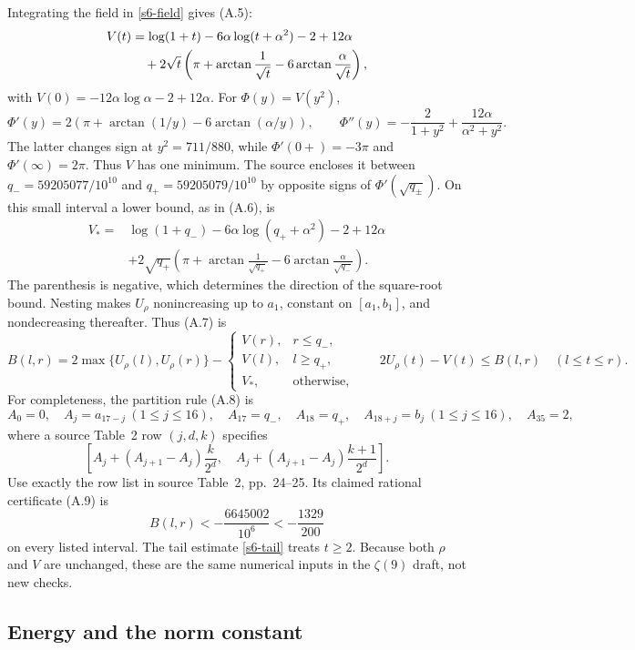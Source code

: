 Integrating the field in \eqref{s6-field} gives (A.5):
\begin{align}
 V(t)&=\log(1+t)-6\alpha\log(t+\alpha^2)-2+12\alpha\notag\\
 &\quad+2\sqrt t\left(\pi+\arctan\frac1{\sqrt t}
                                -6\arctan\frac\alpha{\sqrt t}\right),
 \label{appa-field-explicit}
\end{align}
with $V(0)=-12\alpha\log\alpha-2+12\alpha$.
For $\Phi(y)=V(y^2)$,
\[
 \Phi'(y)=2\left(\pi+\arctan(1/y)-6\arctan(\alpha/y)\right),
 \qquad \Phi''(y)=-\frac2{1+y^2}+\frac{12\alpha}{\alpha^2+y^2}.
\]
The latter changes sign at $y^2=711/880$, while
$\Phi'(0+)=-3\pi$ and $\Phi'(\infty)=2\pi$.  Thus $V$ has one minimum.
The source encloses it between
$q_-=59205077/10^{10}$ and $q_+=59205079/10^{10}$ by opposite
signs of $\Phi'(\sqrt{q_\pm})$.
On this small interval a lower bound, as in (A.6), is
\begin{align*}
 V_*={}&\log(1+q_-)-6\alpha\log(q_++\alpha^2)-2+12\alpha\\
 &+2\sqrt{q_+}\left(\pi+\arctan\frac1{\sqrt{q_+}}
                              -6\arctan\frac\alpha{\sqrt{q_-}}\right).
\end{align*}
The parenthesis is negative, which determines the direction of the
square-root bound.  Nesting makes $U_\rho$ nonincreasing up to $a_1$,
constant on $[a_1,b_1]$, and nondecreasing thereafter.  Thus (A.7) is
\[
 B(l,r)=2\max\{U_\rho(l),U_\rho(r)\}
 -\begin{cases}V(r),&r\le q_-,\\V(l),&l\ge q_+,\\V_*,&\text{otherwise},\end{cases}
 \qquad 2U_\rho(t)-V(t)\le B(l,r)\quad(l\le t\le r).
\]
For completeness, the partition rule (A.8) is
\[
 A_0=0,\quad A_j=a_{17-j}\ (1\le j\le16),\quad
 A_{17}=q_-,\quad A_{18}=q_+,\quad
 A_{18+j}=b_j\ (1\le j\le16),\quad A_{35}=2,
\]
where a source Table~2 row $(j,d,k)$ specifies
\[
 \left[A_j+(A_{j+1}-A_j)\frac{k}{2^d},\quad
       A_j+(A_{j+1}-A_j)\frac{k+1}{2^d}\right].
\]
Use exactly the row list in source Table~2, pp.~24--25.  Its claimed
rational certificate (A.9) is
\[
 B(l,r)<-\frac{6645002}{10^6}<-\frac{1329}{200}
\]
on every listed interval.  The tail estimate \eqref{s6-tail} treats
$t\ge2$.  Because both $\rho$ and $V$ are unchanged, these are the same
numerical inputs in the $\zeta(9)$ draft, not new checks.

\subsection{Energy and the norm constant}

